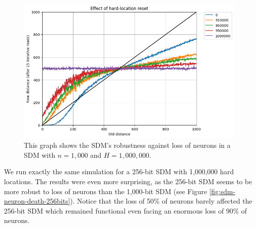 \begin{figure}[!p]
\centering\includegraphics[width=\textwidth]{images02/new-images/sdm-neuron-death.png}
\caption{This graph shows the SDM's robustness against loss of neurons in a SDM with $n=1,000$ and $H=1,000,000$.
\label{fig:sdm-neuron-death-details}}
\end{figure}

We run exactly the same simulation for a 256-bit SDM with 1,000,000 hard locations. The results were even more surprising, as the 256-bit SDM seems to be more robust to loss of neurons than the 1,000-bit SDM (see Figure \ref{fig:sdm-neuron-death-256bits}). Notice that the loss of 50\% of neurons barely affected the 256-bit SDM which remained functional even facing an enormous loss of 90\% of neurons.

